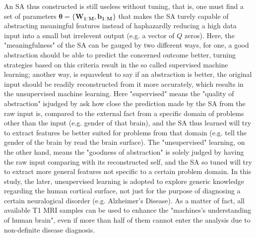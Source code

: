 An SA thus constructed is still useless without tuning, that is, one must find a set of parameters $\boldsymbol{\theta}=\{\boldsymbol{W_{1:M}},\boldsymbol{b_{1:M}}\}$ that makes the SA turely capable of abstracting meaningful features instead of haphazardly reducing a high data input into a small but irrelevent output (e.g. a vector of $Q$ zeros). Here, the "meaningfulness" of the SA can be gauged by two different ways, for one, a good abstraction should be able to predict the concerned outcome better, turning strategies based on this criteria result in the so called supervised machine learning; another way, is equavelent to say if an abstraction is better, the original input should be readily reconstructed from it more accurately, which results in the unsupervised machine learning. Here "supervised" means the "quality of abstraction" isjudged by ask how close the prediction made by the SA from the raw input is, compared to the external fact from a specific domain of problems other than the input (e.g. gender of that brain), and the SA thus learned will try to extract features be better suited for problems from that domain (e.g. tell the gender of the brain by read the brain surface). The "unsupervised" learning, on the other hand, means the "goodness of abstraction" is solely judged by having the raw input comparing with its reconstructed self, and the SA so tuned will try to extract more general features not specific to a certain problem domain. In this study, the later, unsupervised learning is adopted to explore generic knowledge regarding the human cortical surface, not just for the purpose of diagnosing a certain neuralogical disorder (e.g. Alzheimer's Disease). As a matter of fact, all available T1 MRI samples can be used to enhance the "machines's understanding of human brain", even if more than half of them cannot enter the analysis due to non-definite disease diagnosis.

